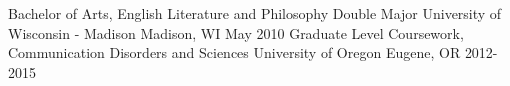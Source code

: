 
\begin{cventries}
      \cventry
    {Bachelor of Arts, English Literature and Philosophy Double Major} %
    {University of Wisconsin - Madison} %
    {Madison, WI} %
    {May 2010} %
    {
    }
    \cventry
    {Graduate Level Coursework, Communication Disorders and Sciences}
    {University of Oregon}
    {Eugene, OR}
    {2012-2015}
    {}
\end{cventries}

